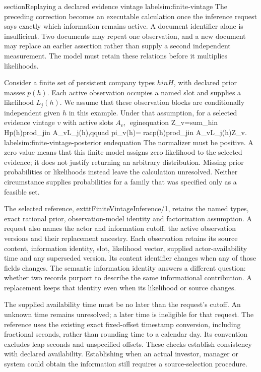 
section{Replaying a declared evidence vintage}
label{sim:finite-vintage}
The preceding correction becomes an executable calculation once the inference
request says exactly which information remains active. A document identifier
alone is insufficient. Two documents may repeat one observation, and a new
document may replace an earlier assertion rather than supply a second
independent measurement. The model must retain these relations before it
multiplies likelihoods.

Consider a finite set of persistent company types $hin H$, with declared prior
masses $p(h)$. Each active observation occupies a named slot and supplies a
likelihood $L_j(h)$. We assume that these observation blocks are conditionally
independent given $h$ in this example. Under that assumption, for a selected
evidence vintage $v$ with active slots $A_v$,
egin{equation}
 Z_v=sum_{hin H}p(h)prod_{jin A_v}L_j(h),qquad
 pi_v(h)=rac{p(h)prod_{jin A_v}L_j(h)}{Z_v}.
 label{sim:finite-vintage-posterior}
end{equation}
The normalizer must be positive. A zero value means that this finite model
assigns zero likelihood to the selected evidence; it does not justify returning
an arbitrary distribution. Missing prior probabilities or likelihoods instead
leave the calculation unresolved. Neither circumstance supplies probabilities
for a family that was specified only as a feasible set.

The selected reference, 	exttt{FiniteVintageInference/1}, retains the named
types, exact rational prior, observation-model identity and factorization
assumption. A request also names the actor and information cutoff, the active
observation versions and their replacement ancestry. Each observation retains
its source content, information identity, slot, likelihood vector, supplied
actor-availability time and any superseded version. Its content identifier
changes when any of those fields changes. The semantic information identity
answers a different question: whether two records purport to describe the
same informational contribution. A replacement keeps that identity even when
its likelihood or source changes.

The supplied availability time must be no later than the request's cutoff.
An unknown time remains unresolved; a later time is ineligible for that
request. The reference uses the existing exact fixed-offset timestamp
conversion, including fractional seconds, rather than rounding time to a
calendar day. Its convention excludes leap seconds and unspecified offsets.
These checks establish consistency with declared availability. Establishing
when an actual investor, manager or system could obtain the information still
requires a source-selection procedure.

